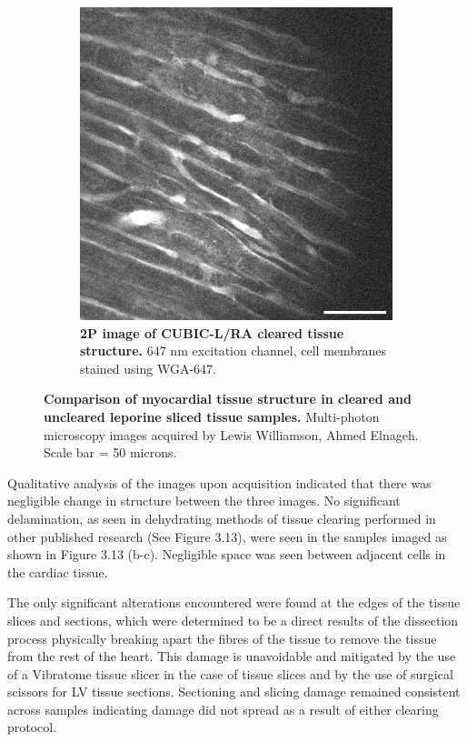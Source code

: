 \begin{figure}[H]
\begin{subfigure}[t]{0.475\textwidth}
\includegraphics[width=1\linewidth]{Images/CUBIC_Structure.png}
\caption{\textbf{2P image of CUBIC-L/RA cleared tissue structure.} 647 nm excitation channel, cell membranes stained using WGA-647.}
\label{fig:enter-label}
\end{subfigure}
\caption{\textbf{Comparison of myocardial tissue structure in cleared and uncleared leporine sliced tissue samples.} Multi-photon microscopy images acquired by Lewis Williamson, Ahmed Elnageh. Scale bar = 50 microns.}
\end{figure}

Qualitative analysis of the images upon acquisition indicated that there was negligible change in structure between the three images. No significant delamination, as seen in dehydrating methods of tissue clearing performed in other published research (See Figure 3.13), were seen in the samples imaged as shown in Figure 3.13 (b-c). Negligible space was seen between adjacent cells in the cardiac tissue. 

The only significant alterations encountered were found at the edges of the tissue slices and sections, which were determined to be a direct results of the dissection process physically breaking apart the fibres of the tissue to remove the tissue from the rest of the heart. This damage is unavoidable and mitigated by the use of a Vibratome tissue slicer in the case of tissue slices and by the use of surgical scissors for LV tissue sections. Sectioning and slicing damage remained consistent across samples indicating damage did not spread as a result of either clearing protocol.

